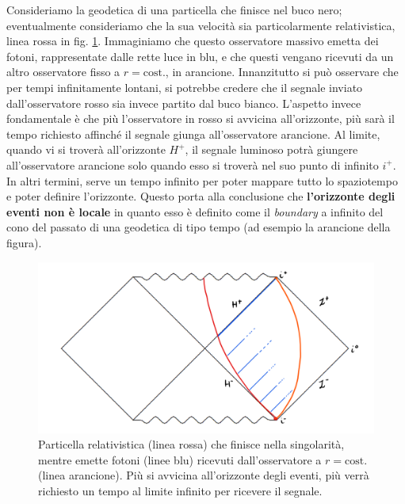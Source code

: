 Consideriamo la geodetica di una particella che finisce nel buco nero; eventualmente consideriamo che la sua velocità sia particolarmente relativistica, linea rossa in fig. \ref{fig.penschwarz_orizz}. Immaginiamo che questo osservatore massivo emetta dei fotoni, rappresentate dalle rette luce in blu, e che questi vengano ricevuti da un altro osservatore fisso a $r = \textrm{cost.}$, in arancione.
Innanzitutto si può osservare che per tempi infinitamente lontani, si potrebbe credere che il segnale inviato dall'osservatore rosso sia invece partito dal buco bianco. L'aspetto invece fondamentale è che più l'osservatore in rosso si avvicina all'orizzonte, più sarà il tempo richiesto affinché il segnale giunga all'osservatore arancione. Al limite, quando vi si troverà all'orizzonte $H^+$, il segnale luminoso potrà giungere all'osservatore arancione solo quando esso si troverà nel suo punto di infinito $i^+$.
In altri termini, serve un tempo infinito per poter mappare tutto lo spaziotempo e poter definire l'orizzonte. Questo porta alla conclusione che \textbf{l'orizzonte degli eventi non è locale} in quanto esso è definito come il \emph{boundary} a infinito del cono del passato di una geodetica di tipo tempo (ad esempio la arancione della figura).
\begin{figure}
    \centering
    \includegraphics[scale=0.45]{immagini/penschwarz_orizz.png}
    \caption{Particella relativistica (linea rossa) che finisce nella singolarità, mentre emette fotoni (linee blu) ricevuti dall'osservatore a $r=\textrm{cost.}$ (linea arancione). Più si avvicina all'orizzonte degli eventi, più verrà richiesto un tempo al limite infinito per ricevere il segnale.}
    \label{fig.penschwarz_orizz}
\end{figure}
